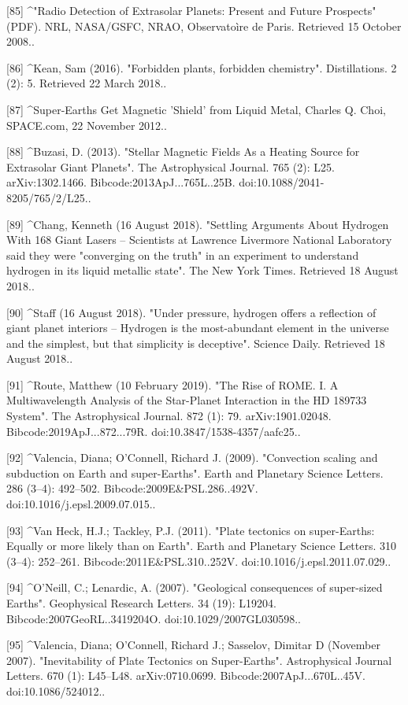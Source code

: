 [85]
^"Radio Detection of Extrasolar Planets: Present and Future Prospects" (PDF). NRL, NASA/GSFC, NRAO, Observatoìre de Paris. Retrieved 15 October 2008..

[86]
^Kean, Sam (2016). "Forbidden plants, forbidden chemistry". Distillations. 2 (2): 5. Retrieved 22 March 2018..

[87]
^Super-Earths Get Magnetic 'Shield' from Liquid Metal, Charles Q. Choi, SPACE.com, 22 November 2012..

[88]
^Buzasi, D. (2013). "Stellar Magnetic Fields As a Heating Source for Extrasolar Giant Planets". The Astrophysical Journal. 765 (2): L25. arXiv:1302.1466. Bibcode:2013ApJ...765L..25B. doi:10.1088/2041-8205/765/2/L25..

[89]
^Chang, Kenneth (16 August 2018). "Settling Arguments About Hydrogen With 168 Giant Lasers – Scientists at Lawrence Livermore National Laboratory said they were "converging on the truth" in an experiment to understand hydrogen in its liquid metallic state". The New York Times. Retrieved 18 August 2018..

[90]
^Staff (16 August 2018). "Under pressure, hydrogen offers a reflection of giant planet interiors – Hydrogen is the most-abundant element in the universe and the simplest, but that simplicity is deceptive". Science Daily. Retrieved 18 August 2018..

[91]
^Route, Matthew (10 February 2019). "The Rise of ROME. I. A Multiwavelength Analysis of the Star-Planet Interaction in the HD 189733 System". The Astrophysical Journal. 872 (1): 79. arXiv:1901.02048. Bibcode:2019ApJ...872...79R. doi:10.3847/1538-4357/aafc25..

[92]
^Valencia, Diana; O'Connell, Richard J. (2009). "Convection scaling and subduction on Earth and super-Earths". Earth and Planetary Science Letters. 286 (3–4): 492–502. Bibcode:2009E&PSL.286..492V. doi:10.1016/j.epsl.2009.07.015..

[93]
^Van Heck, H.J.; Tackley, P.J. (2011). "Plate tectonics on super-Earths: Equally or more likely than on Earth". Earth and Planetary Science Letters. 310 (3–4): 252–261. Bibcode:2011E&PSL.310..252V. doi:10.1016/j.epsl.2011.07.029..

[94]
^O'Neill, C.; Lenardic, A. (2007). "Geological consequences of super-sized Earths". Geophysical Research Letters. 34 (19): L19204. Bibcode:2007GeoRL..3419204O. doi:10.1029/2007GL030598..

[95]
^Valencia, Diana; O'Connell, Richard J.; Sasselov, Dimitar D (November 2007). "Inevitability of Plate Tectonics on Super-Earths". Astrophysical Journal Letters. 670 (1): L45–L48. arXiv:0710.0699. Bibcode:2007ApJ...670L..45V. doi:10.1086/524012..

